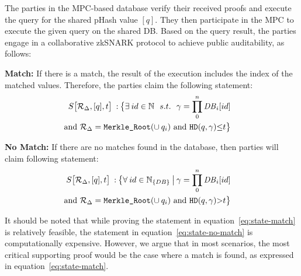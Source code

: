 \begin{compactitem}
    \item[]  The parties in the MPC-based database verify their received proofs and execute the query for the shared pHash value $[q]$. They then participate in the MPC to execute the given query on the shared DB. Based on the query result, the parties engage in a collaborative zkSNARK protocol to achieve public auditability, as follows:
    \begin{compactitem}
        \item \textbf{Match:} If there is a match, the result of the execution includes the index of the matched values. Therefore, the parties claim the following statement:
        \begin{equation}\label{eq:state-match}
            \begin{split}
            \hspace{-0.5cm}S\bigr[\mathcal{R}_\Delta, [q] ,t\bigr] \: :\: \bigr\{ \exists \: id\in \mathbb{N}\:\:\: s.t. \:\:\: \gamma=\prod_0^n \mathit{DB}_i[id]\\
            \hspace{-0.5cm}\mbox{ and } \mathcal{R}_\Delta=\mbox{\texttt{Merkle\_Root}}(\cup \: q_i)\mbox{ and }  \mbox{\texttt{HD}}(q,\gamma) {\leq} t\bigr\}
            \end{split}
        \end{equation}
        \item \textbf{No Match:} If there are no matches found in the database, then parties will claim following statement:
        \begin{equation}\label{eq:state-no-match}
            \begin{split}
            \hspace{-0.5cm}S\bigr[\mathcal{R}_\Delta, [q] ,t\bigr] \: :\: \bigr\{ \forall \: id\in \mathbb{N}_{\{DB\}}\: \bigr|\: \gamma=\prod_0^n \mathit{DB}_i[id]\\
            \hspace{-0.5cm}\mbox{ and } \mathcal{R}_\Delta=\mbox{\texttt{Merkle\_Root}}(\cup \: q_i)\mbox{ and } \mbox{\texttt{HD}}(q,\gamma) {>} t \bigr\}
            \end{split}
        \end{equation}
    \end{compactitem}
    It should be noted that while proving the statement in equation~\ref{eq:state-match} is relatively feasible, the statement in equation~\ref{eq:state-no-match} is computationally expensive. However, we argue that in most scenarios, the most critical supporting proof would be the case where a match is found, as expressed in equation~\ref{eq:state-match}.

\end{compactitem}

